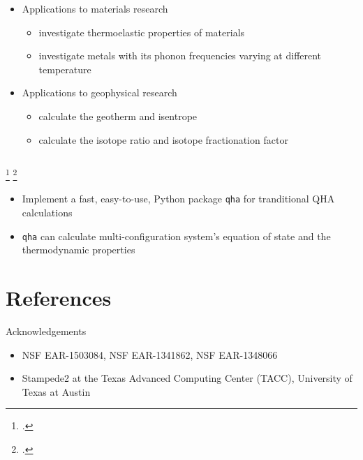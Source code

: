 \documentclass[13pt,aspectratio=169]{beamer}
\begin{document}
\begin{frame}{\subsecname}
\begin{columns}
		\begin{column}{0.45\textwidth}
			\begin{itemize}[<+(1)->]
				\item Applications to materials research
				      \begin{itemize}
					      \item investigate thermoelastic properties of materials \footnotemark
					      \item investigate metals with its phonon frequencies varying at different temperature
				      \end{itemize}
				\item Applications to geophysical research
				      \begin{itemize}
					      \item calculate the geotherm and isentrope \footnotemark
					      \item calculate the isotope ratio and isotope fractionation factor
				      \end{itemize}
			\end{itemize}
		\end{column}
	\end{columns}
	\setcounter{footnote}{7}
	\footcitetext{Wu:2011ea}
	\footcitetext{Cardona:2017dd}
\end{frame}

\begin{frame}{\secname}
	\begin{itemize}[<+(1)->]
		\setlength\itemsep{1em}
		\item Implement a fast, easy-to-use, Python package \texttt{qha} for tranditional QHA calculations
		\item \texttt{qha} can calculate multi-configuration system's equation of state and the thermodynamic properties
	\end{itemize}
\end{frame}

\section{References}
\begin{frame}[allowframebreaks]{\secname}
	\printbibliography
\end{frame}

\begin{frame}{Acknowledgements}
	\begin{itemize}
		\item NSF EAR-1503084, NSF EAR-1341862, NSF EAR-1348066
		\item Stampede2 at the Texas Advanced Computing Center (TACC), University of Texas at Austin
	\end{itemize}
\end{frame}
\end{document}
